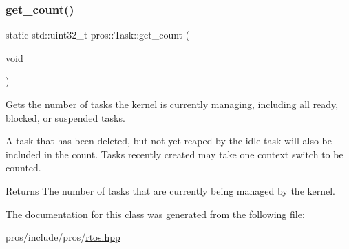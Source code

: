 \subsubsection{\texorpdfstring{get\+\_\+count()}{get\_count()}}
{\footnotesize\ttfamily static std\+::uint32\+\_\+t pros\+::\+Task\+::get\+\_\+count (\begin{DoxyParamCaption}\item[{void}]{ }\end{DoxyParamCaption})\hspace{0.3cm}{\ttfamily [static]}}



Gets the number of tasks the kernel is currently managing, including all ready, blocked, or suspended tasks. 

A task that has been deleted, but not yet reaped by the idle task will also be included in the count. Tasks recently created may take one context switch to be counted.

\begin{DoxyReturn}{Returns}
The number of tasks that are currently being managed by the kernel. 
\end{DoxyReturn}


The documentation for this class was generated from the following file\+:\begin{DoxyCompactItemize}
\item 
pros/include/pros/\hyperlink{rtos_8hpp}{rtos.\+hpp}\end{DoxyCompactItemize}
